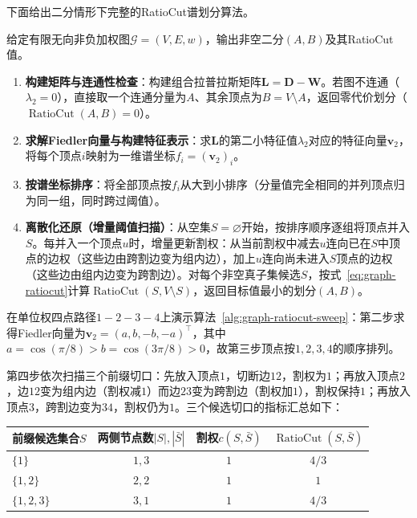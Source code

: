 下面给出二分情形下完整的RatioCut谱划分算法。

\begin{algorithm}[RatioCut谱划分]
\label{alg:graph-ratiocut-sweep}
给定有限无向非负加权图$\mathcal G=(V,E,w)$，输出非空二分$(A,B)$及其RatioCut值。
\begin{enumerate}
\item \textbf{构建矩阵与连通性检查}：构建组合拉普拉斯矩阵$\bm L=\bm D-\bm W$。若图不连通（$\lambda_2=0$），直接取一个连通分量为$A$、其余顶点为$B=V\setminus A$，返回零代价划分（$\operatorname{RatioCut}(A,B)=0$）。
\item \textbf{求解Fiedler向量与构建特征表示}：求$\bm L$的第二小特征值$\lambda_2$对应的特征向量$\bm v_2$，将每个顶点$i$映射为一维谱坐标$f_i=(\bm v_2)_i$。
\item \textbf{按谱坐标排序}：将全部顶点按$f_i$从大到小排序（分量值完全相同的并列顶点归为同一组，同时跨过阈值）。
\item \textbf{离散化还原（增量阈值扫描）}：从空集$S=\varnothing$开始，按排序顺序逐组将顶点并入$S$。每并入一个顶点$u$时，增量更新割权：从当前割权中减去$u$连向已在$S$中顶点的边权（这些边由跨割边变为组内边），加上$u$连向尚未进入$S$顶点的边权（这些边由组内边变为跨割边）。对每个非空真子集候选$S$，按式~\eqref{eq:graph-ratiocut}计算$\operatorname{RatioCut}(S,V\setminus S)$，返回目标值最小的划分$(A,B)$。
\end{enumerate}
\end{algorithm}

在单位权四点路径$1\!-\!2\!-\!3\!-\!4$上演示算法~\ref{alg:graph-ratiocut-sweep}：第二步求得Fiedler向量为$\bm v_2=(a,b,-b,-a)^\top$，其中$a=\cos(\pi/8)>b=\cos(3\pi/8)>0$，故第三步顶点按$1,2,3,4$的顺序排列。

第四步依次扫描三个前缀切口：先放入顶点$1$，切断边$12$，割权为$1$；再放入顶点$2$，边$12$变为组内边（割权减$1$）而边$23$变为跨割边（割权加$1$），割权保持$1$；再放入顶点$3$，跨割边变为$34$，割权仍为$1$。三个候选切口的指标汇总如下：
\begin{center}
\begin{tabular}{lccc}
\toprule
前缀候选集合$S$ & 两侧节点数$|S|,|\bar S|$ & 割权$c(S,\bar S)$ & $\operatorname{RatioCut}(S,\bar S)$\\
\midrule
$\{1\}$ & $1,3$ & $1$ & $4/3$\\
$\{1,2\}$ & $2,2$ & $1$ & $1$\\
$\{1,2,3\}$ & $3,1$ & $1$ & $4/3$\\
\bottomrule
\end{tabular}
\end{center}

